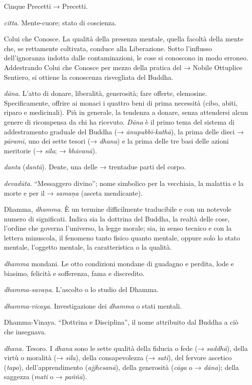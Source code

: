 Cinque Precetti → Precetti.

\emph{citta}. Mente-cuore; stato di coscienza.

Colui che Conosce. La qualità della presenza mentale, quella facoltà
della mente che, se rettamente coltivata, conduce alla Liberazione.
Sotto l'influsso dell'ignoranza indotta dalle contaminazioni, le cose si
conoscono in modo erroneo. Addestrando Colui che Conosce per mezzo della
pratica del → Nobile Ottuplice Sentiero, si ottiene la conoscenza
risvegliata del Buddha.

\emph{dāna}. L'atto di donare, liberalità, generosità; fare offerte,
elemosine. Specificamente, offrire ai monaci i quattro beni di prima
necessità (cibo, abiti, riparo e medicinali). Più in generale, la
tendenza a donare, senza attendersi alcun genere di ricompensa da chi ha
ricevuto. \emph{Dāna} è il primo tema del sistema di addestramento
graduale del Buddha (→ \emph{ānupubbī-kathā}), la prima delle dieci →
\emph{pāramī}, uno dei sette tesori (→ \emph{dhana}) e la prima delle
tre basi delle azioni meritorie (→ \emph{sīla}; → \emph{bhāvanā}).

\emph{danta} (\emph{dantā}). Dente, una delle → trentadue parti del
corpo.

\emph{devadūta}. ``Messaggero divino''; nome simbolico per la vecchiaia,
la malattia e la morte e per il → \emph{samaṇa} (asceta mendicante).

Dhamma, \emph{dhamma}. È un termine difficilmente traducibile e con un
notevole numero di significati. Indica sia la dottrina del Buddha, la
realtà delle cose, l'ordine che governa l'universo, la legge morale;
sia, in senso tecnico e con la lettera minuscola, il fenomeno tanto
fisico quanto mentale, oppure solo lo stato mentale, l'oggetto mentale,
la caratteristica o la qualità.

\emph{dhamma} mondani. Le otto condizioni mondane di guadagno e perdita,
lode e biasimo, felicità e sofferenza, fama e discredito.

\emph{dhamma-savaṇa}. L'ascolto o lo studio del Dhamma.

\emph{dhamma-vicaya}. Investigazione dei \emph{dhamma} o stati mentali.

Dhamma-Vinaya. ``Dottrina e Disciplina'', il nome attribuito dal Buddha
a ciò che insegnava.

\emph{dhana.} Tesoro. I \emph{dhana} sono le sette qualità della fiducia
o fede (→ \emph{saddhā}), della virtù o moralità (→ \emph{sīla}), della
consapevolezza (→ \emph{sati}), del fervore ascetico (\emph{tapo}),
dell'apprendimento (\emph{ajjhesanā}), della generosità (\emph{cāga} o →
\emph{dāna}); della saggezza (\emph{mati} o → \emph{paññā}).

